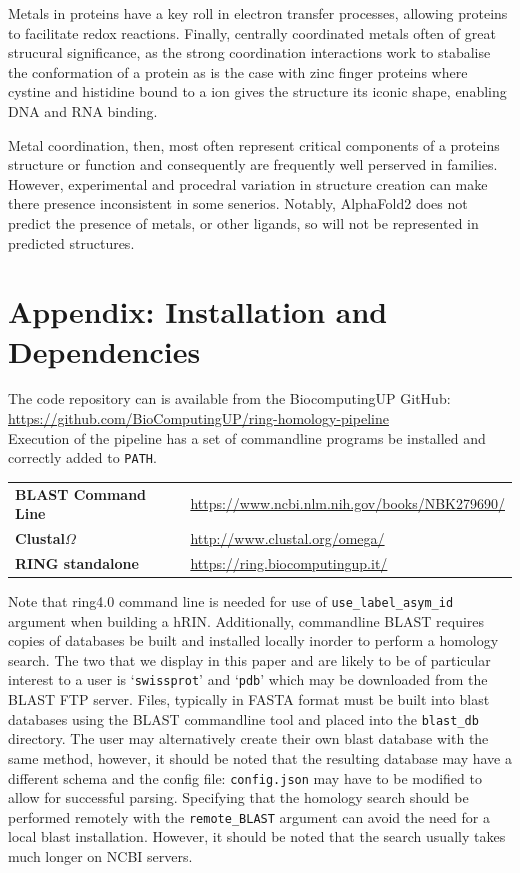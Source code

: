 Metals in proteins have a key roll in electron transfer processes, allowing proteins to facilitate redox reactions. 
Finally, centrally coordinated metals often of great strucural significance, as the strong coordination interactions work to stabalise the conformation of a protein as is the case with zinc finger proteins where cystine and histidine bound to a  ion gives the structure its iconic shape, enabling DNA and RNA binding. 

Metal coordination, then, most often represent critical components of a proteins structure or function and consequently are frequently well perserved in families. However, experimental and procedral variation in structure creation can make there presence inconsistent in some senerios. Notably, AlphaFold2 does not predict the presence of metals, or other ligands, so will not be represented in predicted structures.  

\section{Appendix: Installation and Dependencies}
The code repository can is available from the BiocomputingUP GitHub: \\
\href{https://github.com/BioComputingUP/ring-homology-pipeline}{https://github.com/BioComputingUP/ring-homology-pipeline}\\
Execution of the pipeline has a set of commandline programs be installed and correctly added to \texttt{PATH}. 

\vspace{0.5cm}

\begin{tabular}{l l}
\textbf{BLAST Command Line} & \url{https://www.ncbi.nlm.nih.gov/books/NBK279690/} \\
\textbf{Clustal$\Omega$} & \url{http://www.clustal.org/omega/} \\
\textbf{RING standalone} & \url{https://ring.biocomputingup.it/} \\
\end{tabular}
\vspace{0.5cm}

Note that ring4.0 command line is needed for use of \texttt{use\_label\_asym\_id} argument when building a hRIN. 
Additionally, commandline BLAST requires copies of databases be built and installed locally inorder to perform a homology search. The two that we display in this paper and are likely to be of particular interest to a user is `\texttt{swissprot}' and `\texttt{pdb}' which may be downloaded from the BLAST FTP server. Files, typically in FASTA format must be built into blast databases using the BLAST commandline tool and placed into the \texttt{blast\_db} directory. 
The user may alternatively create their own blast database with the same method, however, it should be noted that the resulting database may have a different schema and the config file: \texttt{config.json} may have to be modified to allow for successful parsing. 
Specifying that the homology search should be performed remotely with the \texttt{remote\_BLAST} argument can avoid the need for a local blast installation. However, it should be noted that the search usually takes much longer on NCBI servers.